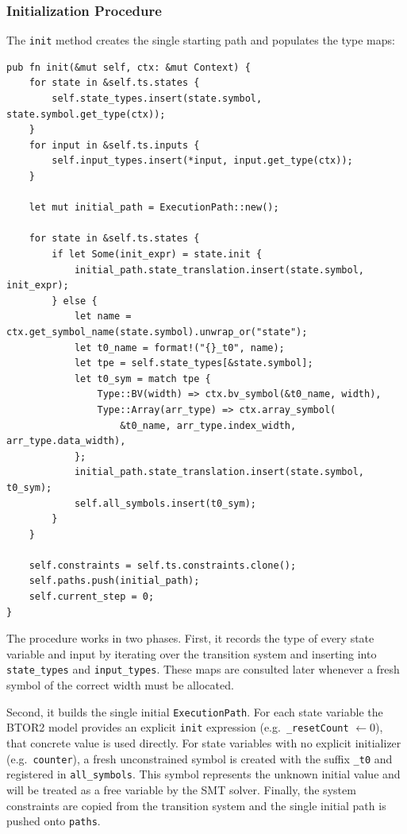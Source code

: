 \documentclass[11pt]{article}
\begin{document}
\subsubsection{Initialization Procedure}

The \texttt{init} method creates the single starting path and populates the type maps:

\begin{center}
\begin{verbatim}
pub fn init(&mut self, ctx: &mut Context) {
    for state in &self.ts.states {
        self.state_types.insert(state.symbol, state.symbol.get_type(ctx));
    }
    for input in &self.ts.inputs {
        self.input_types.insert(*input, input.get_type(ctx));
    }

    let mut initial_path = ExecutionPath::new();

    for state in &self.ts.states {
        if let Some(init_expr) = state.init {
            initial_path.state_translation.insert(state.symbol, init_expr);
        } else {
            let name = ctx.get_symbol_name(state.symbol).unwrap_or("state");
            let t0_name = format!("{}_t0", name);
            let tpe = self.state_types[&state.symbol];
            let t0_sym = match tpe {
                Type::BV(width) => ctx.bv_symbol(&t0_name, width),
                Type::Array(arr_type) => ctx.array_symbol(
                    &t0_name, arr_type.index_width, arr_type.data_width),
            };
            initial_path.state_translation.insert(state.symbol, t0_sym);
            self.all_symbols.insert(t0_sym);
        }
    }

    self.constraints = self.ts.constraints.clone();
    self.paths.push(initial_path);
    self.current_step = 0;
}
\end{verbatim}
\end{center}

The procedure works in two phases. First, it records the type of every state variable and input by iterating over the transition system and inserting into \texttt{state\_types} and \texttt{input\_types}. These maps are consulted later whenever a fresh symbol of the correct width must be allocated.

Second, it builds the single initial \texttt{ExecutionPath}. For each state variable the BTOR2 model provides an explicit \texttt{init} expression (e.g.\ \texttt{\_resetCount} $\gets 0$), that concrete value is used directly. For state variables with no explicit initializer (e.g.\ \texttt{counter}), a fresh unconstrained symbol is created with the suffix \texttt{\_t0} and registered in \texttt{all\_symbols}. This symbol represents the unknown initial value and will be treated as a free variable by the SMT solver. Finally, the system constraints are copied from the transition system and the single initial path is pushed onto \texttt{paths}.
\end{document}
